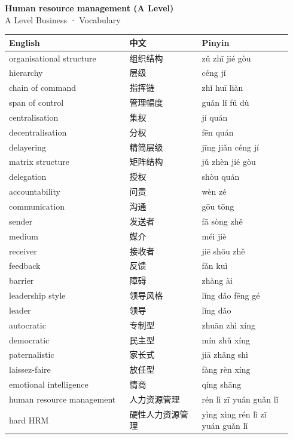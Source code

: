 \documentclass[11pt]{article}
\begin{document}
\begin{center}
  {\LARGE\bfseries Human resource management (A Level)}\\[0.35em]
  {\large A Level Business · Vocabulary}
\end{center}
\vspace{0.6em}

\begin{longtable}{@{}p{0.40\linewidth}p{0.24\linewidth}p{0.30\linewidth}@{}}
\toprule
\textbf{English} & \textbf{中文} & \textbf{Pinyin} \\
\midrule
\endhead
\bottomrule
\endlastfoot
organisational structure & 组织结构 & zǔ zhī jié gòu \\
hierarchy & 层级 & céng jí \\
chain of command & 指挥链 & zhǐ huī liàn \\
span of control & 管理幅度 & guǎn lǐ fú dù \\
centralisation & 集权 & jí quán \\
decentralisation & 分权 & fēn quán \\
delayering & 精简层级 & jīng jiǎn céng jí \\
matrix structure & 矩阵结构 & jǔ zhèn jié gòu \\
delegation & 授权 & shòu quán \\
accountability & 问责 & wèn zé \\
communication & 沟通 & gōu tōng \\
sender & 发送者 & fā sòng zhě \\
medium & 媒介 & méi jiè \\
receiver & 接收者 & jiē shōu zhě \\
feedback & 反馈 & fǎn kuì \\
barrier & 障碍 & zhàng ài \\
leadership style & 领导风格 & lǐng dǎo fēng gé \\
leader & 领导 & lǐng dǎo \\
autocratic & 专制型 & zhuān zhì xíng \\
democratic & 民主型 & mín zhǔ xíng \\
paternalistic & 家长式 & jiā zhǎng shì \\
laissez-faire & 放任型 & fàng rèn xíng \\
emotional intelligence & 情商 & qíng shāng \\
human resource management & 人力资源管理 & rén lì zī yuán guǎn lǐ \\
hard HRM & 硬性人力资源管理 & yìng xìng rén lì zī yuán guǎn lǐ \\

\end{longtable}
\end{document}
